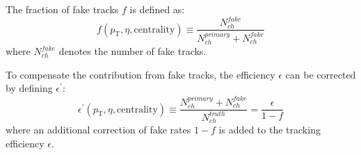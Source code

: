 The fraction of fake tracks $f$ is defined as:
\begin{equation}
f(p_{\text{T}},\eta,\text{centrality})\equiv \frac{N_{ch}^{fake}}{N_{ch}^{primary}+N_{ch}^{fake}}
\end{equation}
where $N_{ch}^{fake}$ denotes the number of fake tracks.

To compensate the contribution from fake tracks, the efficiency $\epsilon$ can be corrected by defining $\epsilon^{'}$:
\begin{equation}
\epsilon^{'}(p_{\text{T}},\eta,\text{centrality})\equiv \frac{N_{ch}^{primary}+N_{ch}^{fake}}{N_{ch}^{truth}}=\frac{\epsilon}{1-f}
\end{equation}
where an additional correction of fake rates $1-f$ is added to the tracking efficiency $\epsilon$.



